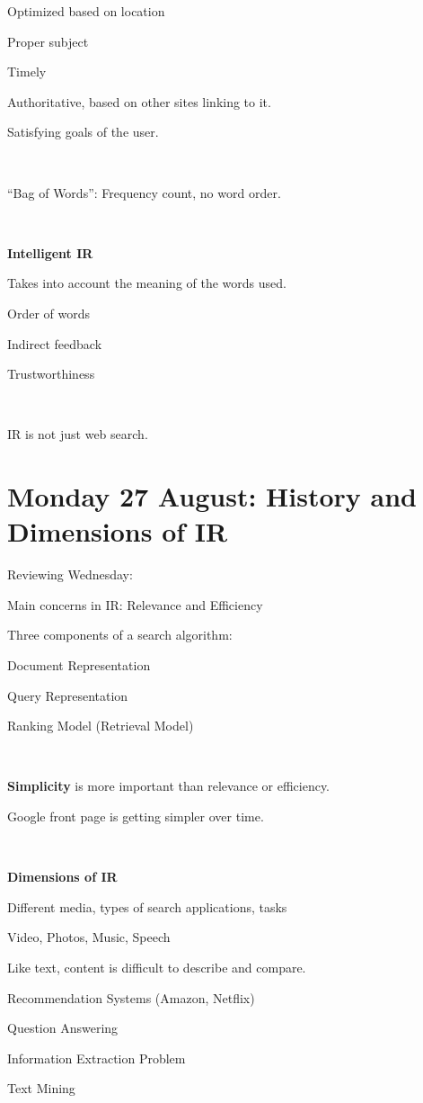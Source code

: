 \documentclass[11pt]{article}
\begin{document}
\begin{spacing}{1.2}
Optimized based on location

Proper subject

Timely

Authoritative, based on other sites linking to it.  

Satisfying goals of the user.  

\

``Bag of Words'':  Frequency count, no word order.  

\

{\bf Intelligent IR}


Takes into account the meaning of the words used.  

Order of words

Indirect feedback

Trustworthiness

\

IR is not just web search.  

\section{Monday 27 August:  History and Dimensions of IR}

Reviewing Wednesday:

\qquad Main concerns in IR:  Relevance and Efficiency

\qquad Three components of a search algorithm:  

\qquad \qquad Document Representation

\qquad \qquad Query Representation

\qquad \qquad Ranking Model (Retrieval Model)

\

{\bf Simplicity} is more important than relevance or efficiency.  

Google front page is getting simpler over time.  

\

{\bf Dimensions of IR}

Different media, types of search applications, tasks

\qquad Video, Photos, Music, Speech

\qquad Like text, content is difficult to describe and compare.  


Recommendation Systems (Amazon, Netflix)

Question Answering

\qquad Information Extraction Problem

Text Mining 


\end{spacing}
\end{document}
